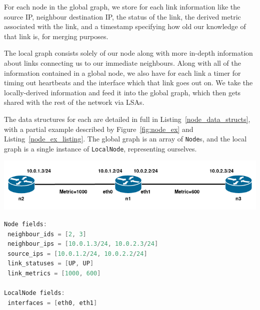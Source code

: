 \documentclass[withindex,glossary,openany]{cam-thesis}
\begin{document}
For each node in the global graph, we store for each link information like the source IP, neighbour destination IP, the status of the link, the derived metric associated with the link, and a timestamp specifying how old our knowledge of that link is, for merging purposes.

The local graph consists solely of our node along with more in-depth information about links connecting us to our immediate neighbours. Along with all of the information contained in a global node, we also have for each link a timer for timing out heartbeats and the interface which that link goes out on. We take the locally-derived information and feed it into the global graph, which then gets shared with the rest of the network via LSAs.

The data structures for each are detailed in full in Listing~\ref{node_data_structs}, with a partial example described by Figure~\ref{fig:node_ex} and Listing~\ref{node_ex_listing}. The global graph is an array of \texttt{Node}s, and the local graph is a single instance of \texttt{LocalNode}, representing ourselves.

\begin{center}
\begin{minipage}{0.9\textwidth} \centering
	\includegraphics[width=1\textwidth]{node}
	\label{fig:node_ex}
\end{minipage}
\end{center}

\begin{minipage}{1\textwidth} \centering
\begin{lstlisting}[language=C, label=node_ex_listing, frame=tb, columns=fullflexible, caption=Psuedocode for some fields of \texttt{Node} and \texttt{LocalNode} filled in node \texttt{n1}.]
Node fields:
 neighbour_ids = [2, 3]
 neighbour_ips = [10.0.1.3/24, 10.0.2.3/24]
 source_ips = [10.0.1.2/24, 10.0.2.2/24]
 link_statuses = [UP, UP]
 link_metrics = [1000, 600]

LocalNode fields:
 interfaces = [eth0, eth1]
\end{lstlisting}
\end{minipage}
\end{document}
